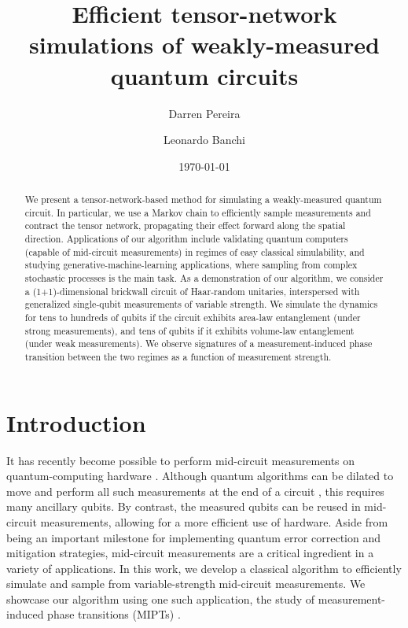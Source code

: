 \documentclass[reprint,amsmath,amssymb,aps, twocolumn, superscriptaddress, prb]{revtex4-2}
\begin{document}
\title{Efficient tensor-network simulations of weakly-measured quantum circuits}
\author{Darren Pereira}
\author{Leonardo Banchi}

\begin{abstract}
  We present a tensor-network-based method for simulating a weakly-measured
  quantum circuit. In particular, we use a Markov chain to efficiently sample measurements and contract
  the tensor network, propagating their effect forward along the spatial
  direction. Applications of our algorithm include validating 
  quantum computers (capable of mid-circuit measurements) in
  regimes of easy classical simulability, and studying
  generative-machine-learning applications, where sampling from complex
  stochastic processes is the main task. 
  As a demonstration of our algorithm, we consider a (1+1)-dimensional
  brickwall circuit of Haar-random unitaries, interspersed with generalized
  single-qubit measurements of variable strength. We simulate the dynamics for
  tens to hundreds of qubits if the circuit exhibits area-law entanglement (under
  strong measurements), and tens of qubits if it exhibits volume-law
  entanglement (under weak measurements). We observe signatures of a
  measurement-induced phase transition between the two regimes as a function of
  measurement strength. 
\end{abstract}

\date{\today}
\maketitle


\section{Introduction}
\label{sec:Intro}

It has recently become possible to perform mid-circuit measurements on quantum-computing hardware \cite{chertkov2023characterizing,noel2022measurement,koh2023measurement,pan2020weak,agrawal2024observing,FengArxiv2025, GoogleMIPT2023}.
Although quantum algorithms can be dilated to move and perform all such measurements at the end of a circuit \cite{nielsen2010quantum}, 
this requires many ancillary qubits. By contrast, the measured qubits can be reused in mid-circuit measurements, 
allowing for a more efficient use of hardware. 
Aside from being an important milestone for implementing quantum error
correction \cite{devitt2013quantum} and mitigation \cite{botelho2022error}
strategies, mid-circuit measurements are a critical ingredient in a variety of
applications. In this work, we develop a classical algorithm to efficiently simulate and sample from variable-strength mid-circuit measurements.
We showcase our algorithm using one such application, the study of measurement-induced phase transitions (MIPTs) \cite{skinner2019measurement,JianPRB2020,BaoPRB2020, RQCAnnuRev2023,PotterVasseurChapter2022}.
\end{document}
